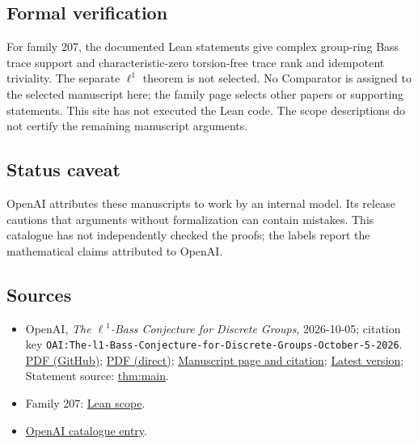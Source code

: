 \documentclass[11pt]{article}
\begin{document}
\subsection{Formal verification}
For family 207, the documented Lean statements give complex group-ring Bass trace support and characteristic-zero torsion-free trace rank and idempotent triviality. The separate $\ell^1$ theorem is not selected. No Comparator is assigned to the selected manuscript here; the family page selects other papers or supporting statements. This site has not executed the Lean code. The scope descriptions do not certify the remaining manuscript arguments.

\subsection{Status caveat}
OpenAI attributes these manuscripts to work by an internal model. Its release cautions that arguments without formalization can contain mistakes. This catalogue has not independently checked the proofs; the labels report the mathematical claims attributed to OpenAI.

\subsection{Sources}
\begin{itemize}
\item OpenAI, \emph{The \(\ell\)\({}^{1}\)-Bass Conjecture for Discrete Groups}, 2026-10-05; citation key \texttt{OAI:The-l1-Bass-Conjecture-for-Discrete-Groups-October-5-2026}. \href{https://github.com/openai/math/blob/adc7f1241b42e322a6451854ab7e4b4c146bf78a/preprints/The-l1-Bass-Conjecture-for-Discrete-Groups-October-5-2026/l1-bass-conjecture.pdf}{PDF (GitHub)}; \href{https://github.com/openai/math/raw/adc7f1241b42e322a6451854ab7e4b4c146bf78a/preprints/The-l1-Bass-Conjecture-for-Discrete-Groups-October-5-2026/l1-bass-conjecture.pdf}{PDF (direct)}; \href{https://github.com/openai/math/blob/adc7f1241b42e322a6451854ab7e4b4c146bf78a/preprints/The-l1-Bass-Conjecture-for-Discrete-Groups-October-5-2026/README.md}{Manuscript page and citation}; \href{https://github.com/openai/math/blob/main/preprints/The-l1-Bass-Conjecture-for-Discrete-Groups-October-5-2026/l1-bass-conjecture.pdf}{Latest version}; Statement source: \href{https://github.com/openai/math/blob/adc7f1241b42e322a6451854ab7e4b4c146bf78a/preprints/The-l1-Bass-Conjecture-for-Discrete-Groups-October-5-2026/build/sections/01-introduction.tex\#L35}{thm:main}.
\item Family 207: \href{https://github.com/openai/math/blob/adc7f1241b42e322a6451854ab7e4b4c146bf78a/lean/docs/207.md}{Lean scope}.
\item \href{https://github.com/openai/math/blob/adc7f1241b42e322a6451854ab7e4b4c146bf78a/CONTENTS.md}{OpenAI catalogue entry}.
\end{itemize}
\end{document}
